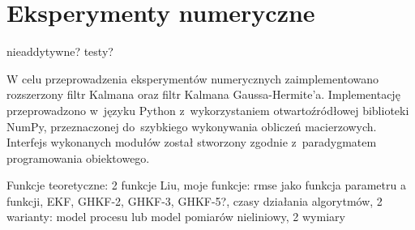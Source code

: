 \chapter{Eksperymenty numeryczne}
\label{cha:numeryczne}
nieaddytywne? testy? \par
W celu przeprowadzenia eksperymentów numerycznych zaimplementowano rozszerzony filtr Kalmana oraz filtr Kalmana Gaussa-Hermite'a. Implementację przeprowadzono w~języku Python z~wykorzystaniem otwartoźródłowej biblioteki NumPy, przeznaczonej do~szybkiego wykonywania obliczeń macierzowych. Interfejs wykonanych modułów został stworzony zgodnie z~paradygmatem programowania obiektowego. \par
Funkcje teoretyczne: 2 funkcje Liu, moje funkcje: rmse jako funkcja parametru a funkcji, EKF, GHKF-2, GHKF-3, GHKF-5?, czasy działania algorytmów, 2 warianty: model procesu lub model pomiarów nieliniowy, 2 wymiary \par
